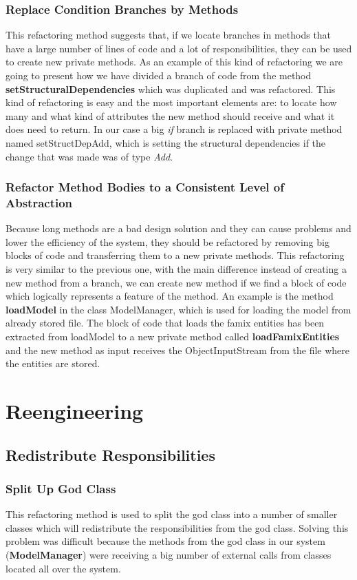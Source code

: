 \documentclass{article}
\begin{document}
\subsubsection{Replace Condition Branches by Methods}
This refactoring method suggests that, if we locate branches in methods that have a large number of lines of code and a lot of responsibilities, they can be used to create new private methods. As an example of this kind of refactoring we are going to present how we have divided a branch of code from the method \textbf{setStructuralDependencies} which was duplicated and was refactored. This kind of refactoring is easy and the most important elements are: to locate how many and what kind of attributes the new method should receive and what it does need to return. In our case a big \emph{if} branch is replaced with private method named setStructDepAdd, which is setting the structural dependencies if the change that was made was of type \emph{Add}.

\subsubsection{Refactor Method Bodies to a Consistent Level of Abstraction}
Because long methods are a bad design solution and they can cause problems and lower the efficiency of the system, they should be refactored by removing big blocks of code and transferring them to a new private methods. This refactoring is very similar to the previous one, with the main difference instead of creating a new method from a branch, we can create new method if we find a block of code which logically represents a feature of the method. An example is the method \textbf{loadModel} in the class ModelManager, which is used for loading the model from already stored file. The block of code that loads the famix entities has been extracted from loadModel to a new private method called \textbf{loadFamixEntities} and the new method as input receives the ObjectInputStream from the file where the entities are stored.

\section{Reengineering}

\subsection{Redistribute Responsibilities}

\subsubsection{Split Up God Class}
This refactoring method is used to split the god class into a number of smaller classes which will redistribute the responsibilities from the god class. Solving this problem was difficult because the methods from the god class in our system (\textbf{ModelManager}) were receiving a big number of external calls from classes located all over the system.
\end{document}
